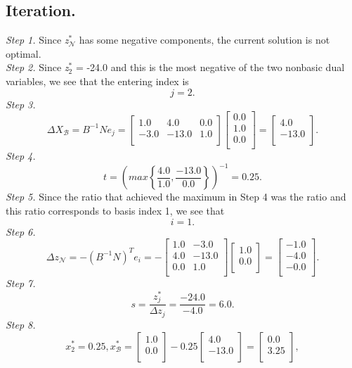 \documentclass [12pt] {article}
\begin{document}
\subsection{  Iteration.}
\textit{Step 1. } Since \textit{z}$^*_{\mathcal N}$ has some negative components, the current solution is not optimal.\\
\textit{Step 2. } Since \textit{z}$^*_2$ = -24.0 and this is the most negative of the two nonbasic dual variables, we see that the entering index is
\[
j = 2.
\]
\textit{Step 3. }
\[
\Delta X_{\mathcal B} = B^{-1} N e_j = \begin{bmatrix} 1.0 & 4.0 & 0.0 \\ -3.0 & -13.0 & 1.0 \\ \end{bmatrix}
\begin{bmatrix} 0.0 \\ 1.0 \\ 0.0 \\ \end{bmatrix}
= \begin{bmatrix} 4.0 \\ -13.0 \\ \end{bmatrix}
.
\]
\textit{Step 4. }
\[
t = \left ( max \left \{ \frac{4.0}{1.0} , \frac{-13.0}{0.0} \right \} \right )^{-1}   = 0.25.
\]\textit{Step 5.} Since the ratio that achieved the maximum in Step 4 was the  ratio and this ratio corresponds to basis index 1, we see that
\[
i = 1.
\]
\textit{Step 6. } 
\[
\Delta z_{\mathcal N} = -\left (B^{-1} N \right )^T e_i = - \begin{bmatrix} 1.0 & -3.0 \\ 4.0 & -13.0 \\ 0.0 & 1.0 \\ \end{bmatrix}
\begin{bmatrix} 1.0 \\ 0.0 \\ \end{bmatrix}
= \begin{bmatrix} -1.0 \\ -4.0 \\ -0.0 \\ \end{bmatrix}.
\]
\textit{Step 7. } 
\[
s =  \frac{z^*_j}{\Delta z_j} = \frac{ -24.0 }{ -4.0 } = 6.0.
\]
\textit{Step 8.}
\[
x^*_2 = 0.25,        x^*_{\mathcal B} = 
\begin{bmatrix} 1.0 \\ 0.0 \\ \end{bmatrix} - 0.25 \begin{bmatrix} 4.0 \\ -13.0 \\ \end{bmatrix} = \begin{bmatrix} 0.0 \\ 3.25 \\ \end{bmatrix} ,
\]
\end{document}
